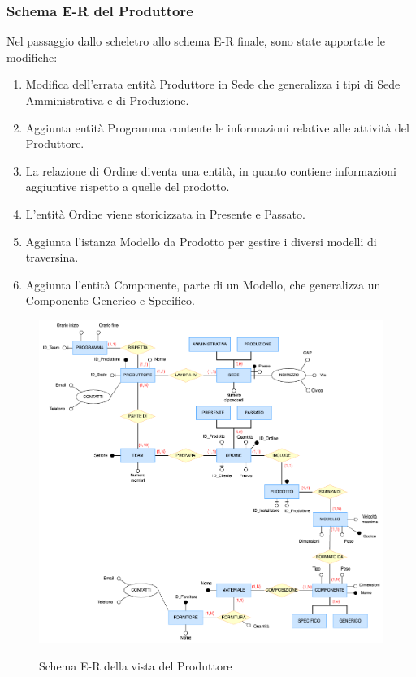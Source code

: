 \documentclass{article}
\begin{document}
\subsubsection{Schema E-R del Produttore}
Nel passaggio dallo scheletro allo schema E-R finale, sono state apportate le modifiche:
\begin{enumerate}
    \item Modifica dell'errata entità Produttore in Sede che generalizza i tipi di Sede Amministrativa e di Produzione.
    \item Aggiunta entità Programma contente le informazioni relative alle attività del Produttore.
    \item La relazione di Ordine diventa una entità, in quanto contiene informazioni aggiuntive rispetto a quelle del prodotto.
    \item L'entità Ordine viene storicizzata in Presente e Passato.
    \item Aggiunta l'istanza Modello da Prodotto per gestire i diversi modelli di traversina.
    \item Aggiunta l'entità Componente, parte di un Modello, che generalizza un Componente Generico e Specifico.
\end{enumerate}

\begin{figure}[H]
    \centering
    \includegraphics[width=15cm]{images/rivisto_produttore.drawio.png}\\
    \caption{Schema E-R della vista del Produttore}
\end{figure}
\end{document}

